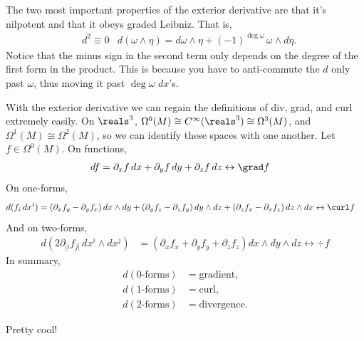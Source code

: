 \documentclass[11pt]{article}
\begin{document}
The two most important properties of the exterior derivative are
that it's nilpotent and that it obeys graded Leibniz. That is,
\begin{align*}
    & d^2 \equiv 0
    & d(\omega \wedge \eta) = d\omega \wedge \eta + (-1)^{\deg{\omega}} \, \omega \wedge d\eta.
\end{align*}
Notice that the minus sign in the second term only depends on the degree
of the first form in the product. This is because you have to anti-commute
the $d$ only past $\omega$, thus moving it past $\deg{\omega}$ $dx$'s.

\begin{eexample}
    With the exterior derivative we can regain the definitions of
    div, grad, and curl extremely easily. On $\reals^3$, $\Omega^0(M)
    \cong C^\infty(\reals^3) \cong \Omega^3(M)$, and $\Omega^1(M) \cong \Omega^2(M)$,
    so we can identify these spaces with one another. Let $f \in \Omega^0(M)$.
    On functions,
    \begin{align*}
        df & = \partial_x f \, dx + \partial_y f \, dy + \partial_z f \, dz \leftrightarrow \grad f
    \end{align*}
    On one-forms,
    \begin{align*}
        d(f_i \, dx^i) & = (\partial_x f_y - \partial_y f_x) \, dx \wedge dy + (\partial_y f_z - \partial_z f_y) \, dy \wedge dz + (\partial_z f_x - \partial_x f_z) \, dz \wedge dx \leftrightarrow \curl f
    \end{align*}
    And on two-forms,
    \begin{align*}
        d(2\partial_{[i} f_{j]} \, dx^i \wedge dx^j) & = \left( \partial_x f_x + \partial_y f_y + \partial_z f_z \right) dx \wedge dy \wedge dz \leftrightarrow \div f
    \end{align*}
    In summary,
    \begin{align*}
        d(0\text{-forms}) & = \text{gradient},\\
        d(1\text{-forms}) & = \text{curl},\\
        d(2\text{-forms}) & = \text{divergence}.
    \end{align*}
\end{eexample}

Pretty cool!

\end{document}
